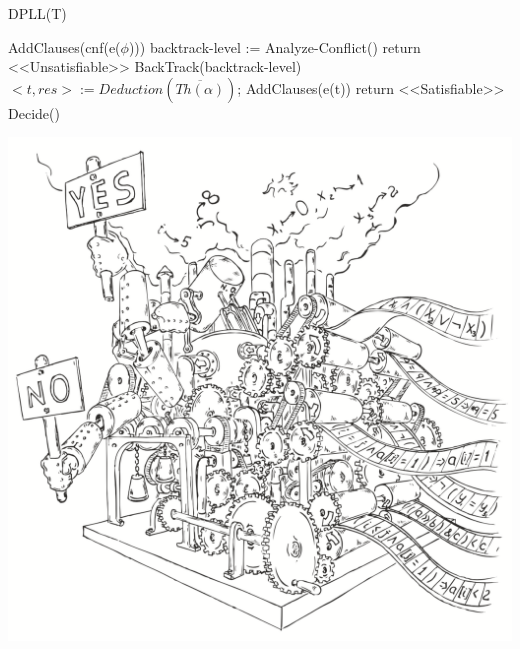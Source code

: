\documentclass{beamer}
\begin{document}
\begin{frame}{DPLL(T)}
\begin{algorithmic}
\State AddClauses(cnf(e($\phi$)))
    \Repeat
            \State backtrack-level := Analyze-Conflict()
                \State return <<Unsatisfiable>>
            \Else
                \State BackTrack(backtrack-level)
            \EndIf
            \State $<t, res> := Deduction(\overline{Th(\alpha)})$; AddClauses(e(t))
        \EndWhile
        \State return <<Satisfiable>>
    \EndIf
    \State Decide()
\EndWhile
\end{algorithmic}
\end{frame}

\begin{frame}
\includegraphics[scale=0.5]{../decision-procedure.png}
\end{frame}
\end{document}
